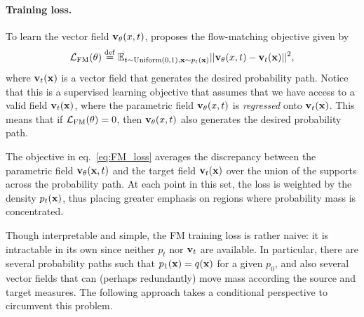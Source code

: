 \paragraph{Training loss.} To learn the vector field ${ \mathbf{v}}_\theta(x,t)$, \cite{lipman2023flowmatching} proposes the flow-matching objective given by 
\begin{equation}
    \label{eq:FM_loss}    
    {\mathcal L}_\text{FM}(\theta) \mathrel{\stackrel{\mathrm{def}}{=}} \mathbb{E}_{t\sim\text{Uniform}\left(0,1\right),{ \mathbf{x}}\sim p_t({ \mathbf{x}})}||{ \mathbf{v}}_\theta(x,t) - { \mathbf{v}}_t({ \mathbf{x}})||^2,
\end{equation}
where ${ \mathbf{v}}_t({ \mathbf{x}})$ is a vector field that generates the desired probability path. Notice that this is a supervised learning objective that assumes that we have access to a valid field ${ \mathbf{v}}_t({ \mathbf{x}})$, where the parametric field ${ \mathbf{v}}_\theta(x,t)$ is \emph{regressed} onto ${ \mathbf{v}}_t({ \mathbf{x}})$. This means that if $ {\mathcal L}_\text{FM}(\theta) = 0$, then ${ \mathbf{v}}_\theta(x,t)$ also generates the desired probability path. 

\begin{remark}
The objective in eq.~\eqref{eq:FM_loss} averages the discrepancy between the parametric field ${ \mathbf{v}}_\theta({ \mathbf{x}},t)$ and the target field ${ \mathbf{v}}_t({ \mathbf{x}})$ over the union of the supports across the probability path. At each point in this set, the loss is weighted by the density $p_t({ \mathbf{x}})$, thus placing greater emphasis on regions where probability mass is concentrated.
\end{remark}

Though interpretable and simple, the FM training loss is rather naive: it is intractable in its own since neither $p_t$ nor ${ \mathbf{v}}_t$ are available. In particular, there are several probability paths such that $p_1({ \mathbf{x}}) = q({ \mathbf{x}})$ for a given $p_0$, and also several vector fields that can (perhaps redundantly) move mass according the source and target measures. The following approach takes a conditional perspective to circumvent this problem. 

